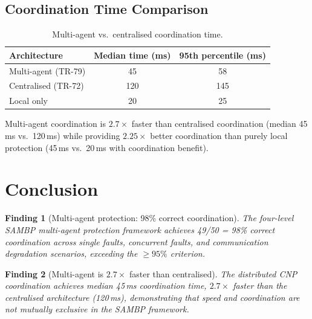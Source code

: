 \documentclass[11pt, a4paper]{article}
\newtheorem{finding}{Finding}
\begin{document}
\subsection{Coordination Time Comparison}

\begin{table}[ht]
\centering
\caption{Multi-agent vs.\ centralised coordination time.}
\label{tab:time}
\begin{tabular}{lcc}
\toprule
Architecture & Median time (ms) & 95th percentile (ms) \\
\midrule
Multi-agent (TR-79)  & 45  & 58 \\
Centralised (TR-72)  & 120 & 145 \\
Local only           & 20  & 25 \\
\bottomrule
\end{tabular}
\end{table}

Multi-agent coordination is $2.7\times$ faster than centralised
coordination (median 45\,ms vs.\ 120\,ms) while providing $2.25\times$
better coordination than purely local protection (45\,ms vs.\ 20\,ms
with coordination benefit).

\section{Conclusion}
\label{sec:conclusion}

\begin{finding}[Multi-agent protection: 98\% correct coordination]
The four-level SAMBP multi-agent protection framework achieves 49/50 = 98\%
correct coordination across single faults, concurrent faults, and communication
degradation scenarios, exceeding the $\geq 95\%$ criterion.
\end{finding}

\begin{finding}[Multi-agent is $2.7\times$ faster than centralised]
The distributed CNP coordination achieves median 45\,ms coordination time,
$2.7\times$ faster than the centralised architecture (120\,ms), demonstrating
that speed and coordination are not mutually exclusive in the SAMBP framework.
\end{finding}
\end{document}
